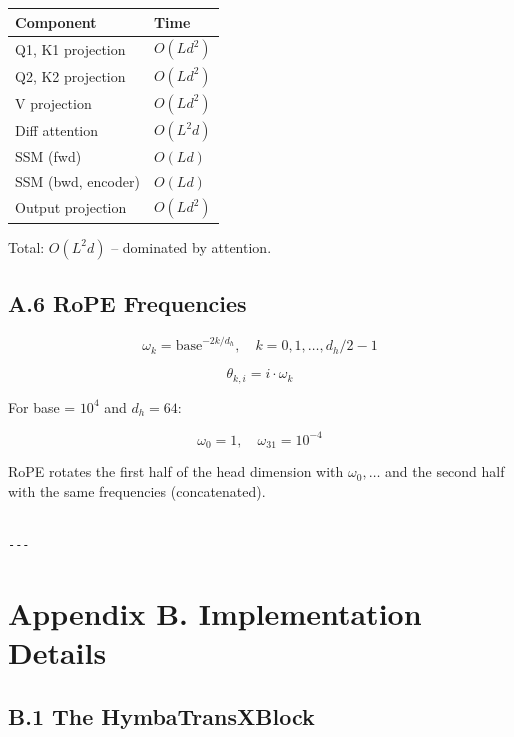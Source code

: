 \begin{table}[H]
\centering
\small
\begin{tabular}{ll}
\toprule
\textbf{Component} & \textbf{Time} \\
\midrule
Q1, K1 projection & $O(L d^2)$ \\
Q2, K2 projection & $O(L d^2)$ \\
V projection & $O(L d^2)$ \\
Diff attention & $O(L^2 d)$ \\
SSM (fwd) & $O(L d)$ \\
SSM (bwd, encoder) & $O(L d)$ \\
Output projection & $O(L d^2)$ \\
\bottomrule
\end{tabular}
\end{table}

Total: $O(L^2 d)$ -- dominated by attention.

\subsection{A.6 RoPE Frequencies}

\[
\omega_k = \text{base}^{-2k/d_h}, \quad k = 0, 1, \dots, d_h/2 - 1
\tag{A.11}
\]

\[
\theta_{k, i} = i \cdot \omega_k
\tag{A.12}
\]

For base = $10^4$ and $d_h = 64$:

\[
\omega_0 = 1, \quad \omega_{31} = 10^{-4}
\tag{A.13}
\]

RoPE rotates the first half of the head dimension with $\omega_0, \dots$ and 
the second half with the same frequencies (concatenated).
\begin{lstlisting}

---
\end{lstlisting}

\section{Appendix B. Implementation Details}

\subsection{B.1 The HymbaTransXBlock}

